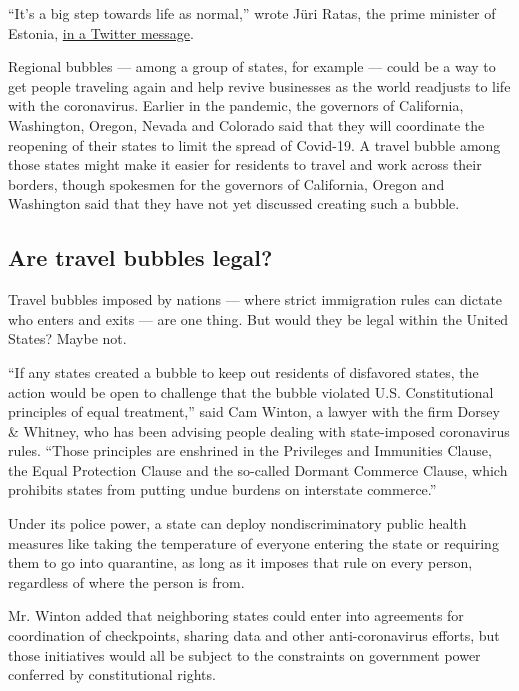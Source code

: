 ``It's a big step towards life as normal,'' wrote Jüri Ratas, the prime
minister of Estonia,
\href{https://twitter.com/ratasjuri/status/1257960686489161733}{in a
Twitter message}.

Regional bubbles --- among a group of states, for example --- could be a
way to get people traveling again and help revive businesses as the
world readjusts to life with the coronavirus. Earlier in the pandemic,
the governors of California, Washington, Oregon, Nevada and Colorado
said that they will coordinate the reopening of their states to limit
the spread of Covid-19. A travel bubble among those states might make it
easier for residents to travel and work across their borders, though
spokesmen for the governors of California, Oregon and Washington said
that they have not yet discussed creating such a bubble.

\hypertarget{are-travel-bubbles-legal}{%
\subsection{Are travel bubbles legal?}\label{are-travel-bubbles-legal}}

Travel bubbles imposed by nations --- where strict immigration rules can
dictate who enters and exits --- are one thing. But would they be legal
within the United States? Maybe not.

``If any states created a bubble to keep out residents of disfavored
states, the action would be open to challenge that the bubble violated
U.S. Constitutional principles of equal treatment,'' said Cam Winton, a
lawyer with the firm Dorsey \& Whitney, who has been advising people
dealing with state-imposed coronavirus rules. ``Those principles are
enshrined in the Privileges and Immunities Clause, the Equal Protection
Clause and the so-called Dormant Commerce Clause, which prohibits states
from putting undue burdens on interstate commerce.''

Under its police power, a state can deploy nondiscriminatory public
health measures like taking the temperature of everyone entering the
state or requiring them to go into quarantine, as long as it imposes
that rule on every person, regardless of where the person is from.

Mr. Winton added that neighboring states could enter into agreements for
coordination of checkpoints, sharing data and other anti-coronavirus
efforts, but those initiatives would all be subject to the constraints
on government power conferred by constitutional rights.

